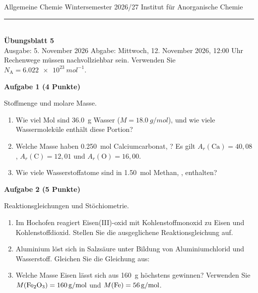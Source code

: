 \documentclass[11pt,a4paper]{article}
\newcommand{\aufgabe}[2]{\bigskip\par\textbf{Aufgabe #1 (#2)}\par\nopagebreak\smallskip}
\begin{document}
{\small Allgemeine Chemie \textperiodcentered{} Wintersemester 2026/27 \hfill Institut für Anorganische Chemie}\\[-0.4em]
\rule{\linewidth}{0.6pt}\\[0.5em]
{\Large\bfseries Übungsblatt 5}\\[0.4em]
Ausgabe: 5. November 2026 \hfill Abgabe: Mittwoch, 12. November 2026, 12:00 Uhr\\[0.3em]
{\small Rechenwege müssen nachvollziehbar sein. Verwenden Sie $N_\mathrm{A} = \qty{6.022e23}{mol^{-1}}$.}

\aufgabe{1}{4 Punkte}
Stoffmenge und molare Masse.
\begin{enumerate}
  \item Wie viel Mol sind \qty{36.0}{g} Wasser ($M = \qty{18.0}{g/mol}$), und wie viele Wassermoleküle
        enthält diese Portion?
  \item Welche Masse haben \qty{0.250}{mol} Calciumcarbonat, ? Es gilt
        $A_r(\mathrm{Ca}) = 40{,}08$, $A_r(\mathrm{C}) = 12{,}01$ und $A_r(\mathrm{O}) = 16{,}00$.
  \item Wie viele Wasserstoffatome sind in \qty{1.50}{mol} Methan, , enthalten?
\end{enumerate}

\aufgabe{2}{5 Punkte}
Reaktionsgleichungen und Stöchiometrie.
\begin{enumerate}
  \item Im Hochofen reagiert Eisen(III)-oxid mit Kohlenstoffmonoxid zu Eisen und Kohlenstoffdioxid.
        Stellen Sie die ausgeglichene Reaktionsgleichung auf.
  \item Aluminium löst sich in Salzsäure unter Bildung von Aluminiumchlorid und Wasserstoff.
        Gleichen Sie die Gleichung aus: 
  \item Welche Masse Eisen lässt sich aus \qty{160}{g}  höchstens gewinnen?
        Verwenden Sie $M(\ce{Fe2O3}) = \qty{160}{g/mol}$ und $M(\ce{Fe}) = \qty{56}{g/mol}$.
\end{enumerate}
\end{document}
